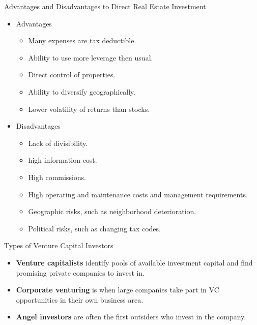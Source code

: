 \documentclass[../custom,grid]{flashcards}
\begin{document}
\begin{flashcard}{Advantages and Disadvantages to Direct Real Estate Investment}
    \begin{itemize}
        \item Advantages
        \begin{itemize}
            \item Many expenses are tax deductible.
            \item Ability to use more leverage then usual.
            \item Direct control of properties.
            \item Ability to diversify geographically.
            \item Lower volatility of returns than stocks.
        \end{itemize}
        \item Disadvantages
        \begin{itemize}
            \item Lack of divisibility.
            \item high information cost.
            \item High commissions.
            \item High operating and maintenance costs and management requirements.
            \item Geographic risks, such as neighborhood deterioration.
            \item Political risks, such as changing tax codes.
        \end{itemize}
    \end{itemize}
\end{flashcard}

\begin{flashcard}{Types of Venture Capital Investors}
    \begin{itemize}
        \item \textbf{Venture capitalists} identify pools of available investment capital and find promising private companies to invest in.
        \item \textbf{Corporate venturing} is when large companies take part in VC opportunities in their own business area.
        \item \textbf{Angel investors} are often the first outsiders who invest in the company.
    \end{itemize}
\end{flashcard}
\end{document}
